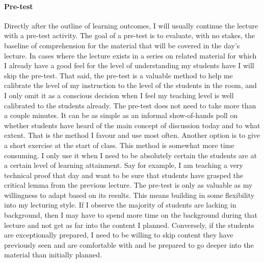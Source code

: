\documentclass{article}
\begin{document}
\paragraph{Pre-test}Directly after the outline of learning outcomes, I will usually continue the lecture with a pre-test activity. The goal of a pre-test is to evaluate, with no stakes, the baseline of comprehension for the material that will be covered in the day's lecture. In cases where the lecture exists in a series on related material for which I already have a good feel for the level of understanding my students have I will skip the pre-test. That said, the pre-test is a valuable method to help me calibrate the level of my instruction to the level of the students in the room, and I only omit it as a conscious decision when I feel my teaching level is well calibrated to the students already. The pre-test does not need to take more than a couple minutes. It can be as simple as an informal show-of-hands poll on whether students have heard of the main concept of discussion today and to what extent. That is the method I favour and use most often. Another option is to give a short exercise at the start of class. This method is somewhat more time consuming. I only use it when I need to be absolutely certain the students are at a certain level of learning attainment. Say for example, I am teaching a very technical proof that day and want to be sure that students have grasped the critical lemma from the previous lecture. The pre-test is only as valuable as my willingness to adapt based on its results. This means building in some flexibility into my lecturing style. If I observe the majority of students are lacking in background, then I may have to spend more time on the background during that lecture and not get as far into the content I planned. Conversely, if the students are exceptionally prepared, I need to be willing to skip content they have previously seen and are comfortable with and be prepared to go deeper into the material than initially planned.
\end{document}
